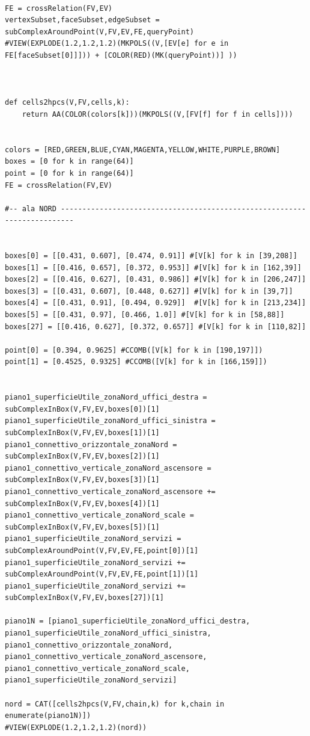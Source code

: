 \documentclass[11pt, oneside]{article}   	%
\begin{document}
\begin{verbatim}
     
FE = crossRelation(FV,EV)
vertexSubset,faceSubset,edgeSubset = subComplexAroundPoint(V,FV,EV,FE,queryPoint)
#VIEW(EXPLODE(1.2,1.2,1.2)(MKPOLS((V,[EV[e] for e in FE[faceSubset[0]]])) + [COLOR(RED)(MK(queryPoint))] ))



def cells2hpcs(V,FV,cells,k): 
    return AA(COLOR(colors[k]))(MKPOLS((V,[FV[f] for f in cells])))


colors = [RED,GREEN,BLUE,CYAN,MAGENTA,YELLOW,WHITE,PURPLE,BROWN]
boxes = [0 for k in range(64)]
point = [0 for k in range(64)]
FE = crossRelation(FV,EV)

#-- ala NORD -------------------------------------------------------------------------


boxes[0] = [[0.431, 0.607], [0.474, 0.91]] #[V[k] for k in [39,208]]
boxes[1] = [[0.416, 0.657], [0.372, 0.953]] #[V[k] for k in [162,39]]
boxes[2] = [[0.416, 0.627], [0.431, 0.986]] #[V[k] for k in [206,247]]
boxes[3] = [[0.431, 0.607], [0.448, 0.627]] #[V[k] for k in [39,7]]
boxes[4] = [[0.431, 0.91], [0.494, 0.929]]  #[V[k] for k in [213,234]]
boxes[5] = [[0.431, 0.97], [0.466, 1.0]] #[V[k] for k in [58,88]]
boxes[27] = [[0.416, 0.627], [0.372, 0.657]] #[V[k] for k in [110,82]]

point[0] = [0.394, 0.9625] #CCOMB([V[k] for k in [190,197]])
point[1] = [0.4525, 0.9325] #CCOMB([V[k] for k in [166,159]])


piano1_superficieUtile_zonaNord_uffici_destra = subComplexInBox(V,FV,EV,boxes[0])[1]
piano1_superficieUtile_zonaNord_uffici_sinistra = subComplexInBox(V,FV,EV,boxes[1])[1]
piano1_connettivo_orizzontale_zonaNord = subComplexInBox(V,FV,EV,boxes[2])[1]
piano1_connettivo_verticale_zonaNord_ascensore = subComplexInBox(V,FV,EV,boxes[3])[1]
piano1_connettivo_verticale_zonaNord_ascensore += subComplexInBox(V,FV,EV,boxes[4])[1]
piano1_connettivo_verticale_zonaNord_scale = subComplexInBox(V,FV,EV,boxes[5])[1]
piano1_superficieUtile_zonaNord_servizi = subComplexAroundPoint(V,FV,EV,FE,point[0])[1]
piano1_superficieUtile_zonaNord_servizi += subComplexAroundPoint(V,FV,EV,FE,point[1])[1]
piano1_superficieUtile_zonaNord_servizi += subComplexInBox(V,FV,EV,boxes[27])[1]

piano1N = [piano1_superficieUtile_zonaNord_uffici_destra, piano1_superficieUtile_zonaNord_uffici_sinistra, piano1_connettivo_orizzontale_zonaNord, piano1_connettivo_verticale_zonaNord_ascensore, piano1_connettivo_verticale_zonaNord_scale, piano1_superficieUtile_zonaNord_servizi]
    
nord = CAT([cells2hpcs(V,FV,chain,k) for k,chain in enumerate(piano1N)])
#VIEW(EXPLODE(1.2,1.2,1.2)(nord))


\end{verbatim}
\end{document}
